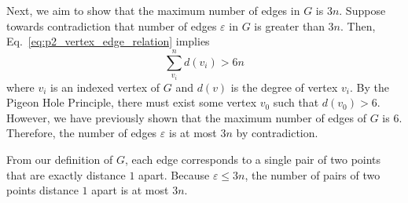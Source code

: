 \documentclass[12pt]{extarticle}
\begin{document}
\begin{sol}
	Next, we aim to show that the maximum number of edges in $G$ is $3n$.
	Suppose towards contradiction that number of edges $\varepsilon$ in $G$ is greater than $3n$.
	Then, Eq.~\eqref{eq:p2_vertex_edge_relation} implies
	\begin{equation}
		\sum_{v_i}^n d(v_i) > 6n
	\end{equation}
	where $v_i$ is an indexed vertex of $G$ and $d(v)$ is the degree of vertex $v_i$.
	By the Pigeon Hole Principle, there must exist some vertex $v_0$ such that $d(v_0) > 6$.
	However, we have previously shown that the maximum number of edges of $G$ is $6$.
	Therefore, the number of edges $\varepsilon$ is at most $3n$ by contradiction.

	From our definition of $G$, each edge corresponds to a single pair of two points that are exactly distance $1$ apart.
	Because $\varepsilon \leq 3n$, the number of pairs of two points distance $1$ apart is at most $3n$.
\end{sol}
\end{document}
